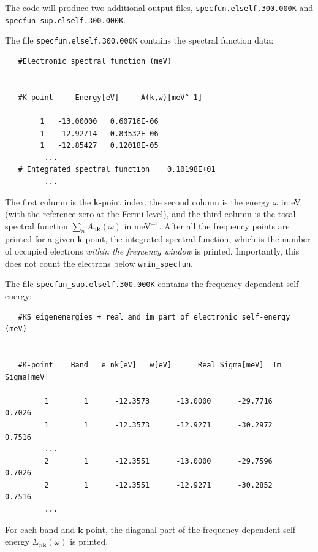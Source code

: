 \documentclass[a4paper,11pt,serif]{article}
\newcommand{\mb}[1]{\mathbf{#1}}
\begin{document}
The code will produce two additional output files, \texttt{specfun.elself.300.000K} and\\
\texttt{specfun\_sup.elself.300.000K}.


The file \texttt{specfun.elself.300.000K} contains the spectral function data:
{\color{cverb} \small
\begin{verbatim}
   #Electronic spectral function (meV)


   #K-point     Energy[eV]     A(k,w)[meV^-1]

        1   -13.00000   0.60716E-06
        1   -12.92714   0.83532E-06
        1   -12.85427   0.12018E-05
         ...
   # Integrated spectral function    0.10198E+01
         ...
\end{verbatim}
}

The first column is the $\mb{k}$-point index, the second column is the energy $\omega$ in eV (with the reference zero at the Fermi level), and the third column is the total spectral function $\sum_{n} A_{n\mb{k}}(\omega)$ in meV$^{-1}$.
After all the frequency points are printed for a given $\mb{k}$-point, the integrated spectral function, which is the number of occupied electrons \emph{within the frequency window} is printed.
Importantly, this does not count the electrons below \texttt{wmin\_specfun}.


\vspace{0.2cm}

The file \texttt{specfun\_sup.elself.300.000K} contains the frequency-dependent self-energy:
{\color{cverb} \small
\begin{verbatim}
   #KS eigenenergies + real and im part of electronic self-energy (meV)


   #K-point    Band   e_nk[eV]   w[eV]      Real Sigma[meV]  Im Sigma[meV]

         1        1      -12.3573      -13.0000      -29.7716        0.7026
         1        1      -12.3573      -12.9271      -30.2972        0.7516
         ...
         2        1      -12.3551      -13.0000      -29.7596        0.7026
         2        1      -12.3551      -12.9271      -30.2852        0.7516
         ...
\end{verbatim}
}

For each band and $\mb{k}$ point, the diagonal part of the frequency-dependent self-energy $\Sigma_{n\mb{k}}(\omega)$ is printed.


\vspace{0.2cm}
\end{document}
